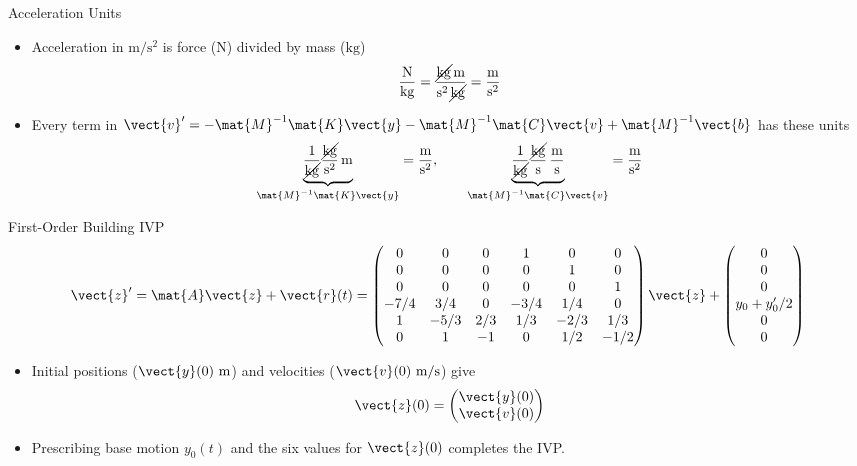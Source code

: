 \begin{frame}{Acceleration Units}
\begin{itemize}
  \item Acceleration in $\mathrm{m/s^2}$ is force ($\mathrm{N}$) divided by mass ($\mathrm{kg}$)
  \[
    \frac{\mathrm{N}}{\mathrm{kg}}
    =\frac{\cancel{\mathrm{kg}}\,\mathrm{m}}{\mathrm{s}^2\,\cancel{\mathrm{kg}}}
    =\frac{\mathrm{m}}{\mathrm{s}^2}
  \]
  \item Every term in $\vect{v}'=-\mat{M}^{-1}\mat{K}\vect{y}-\mat{M}^{-1}\mat{C}\vect{v}+\mat{M}^{-1}\vect{b}$ has these units
  \[
    \underbrace{\frac{1}{\cancel{\mathrm{kg}}}
      \frac{\cancel{\mathrm{kg}}}{\mathrm{s}^2}\,\mathrm{m}}
      _{\mat{M}^{-1}\mat{K}\vect{y}}
    =\frac{\mathrm{m}}{\mathrm{s}^2},\qquad
    \underbrace{\frac{1}{\cancel{\mathrm{kg}}}
      \frac{\cancel{\mathrm{kg}}}{\mathrm{s}}\,
      \frac{\mathrm{m}}{\mathrm{s}}}
      _{\mat{M}^{-1}\mat{C}\vect{v}}
    =\frac{\mathrm{m}}{\mathrm{s}^2}
  \]
\end{itemize}
\end{frame}
\begin{frame}{First-Order Building IVP}
\[
  \vect{z}'=\mat{A}\vect{z}+\vect{r}(t)=
  \begin{pmatrix}
    0&0&0&1&0&0\\
    0&0&0&0&1&0\\
    0&0&0&0&0&1\\
    -7/4&3/4&0&-3/4&1/4&0\\
    1&-5/3&2/3&1/3&-2/3&1/3\\
    0&1&-1&0&1/2&-1/2
  \end{pmatrix}\vect{z}
  +\begin{pmatrix}0\\0\\0\\y_0+y_0'/2\\0\\0\end{pmatrix}
\]
\begin{itemize}
  \item Initial positions ($\vect{y}(0)\ \mathrm{m}$) and velocities ($\vect{v}(0)\ \mathrm{m/s}$) give
  \[
    \vect{z}(0)=\begin{pmatrix}\vect{y}(0)\\\vect{v}(0)\end{pmatrix}
  \]
  \item Prescribing base motion $y_0(t)$ and the six values for $\vect{z}(0)$ completes the IVP.
\end{itemize}
\end{frame}
